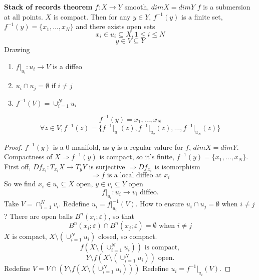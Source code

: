 \begin{theorem}
  \textbf{Stack of records theorem}
  \newline $f: X \to Y$ smooth,
  \newline $dim X = dim Y$
  \newline $f$ is a submersion at all points. $X$ is compact. Then for any $y\in Y$, $f^{-1}(y)$ is a finite set, $f^{-1}(y)=\{x_1,\dots,x_N\}$ and there exists open sets
    $$x_i \in u_i \subseteq X, 1\leq i \leq N$$
    $$y\in V \subseteq Y$$
    Drawing
  \begin{enumerate}[(1)]
    \item $f\rvert_{u_i}: u_i\to V$ is a diffeo
    \item $u_i \cap u_j=\emptyset$ if $i\neq j$
    \item $f^{-1}(V)=\cup_{i=1}^N u_i$
  \end{enumerate}
    $$f^{-1}(y)={x_1,\dots, x_N}$$
    $$\forall z\in V, f^{-1}(z)=\{f^{-1}\rvert_{u_1}(z),f^{-1}\rvert_{u_2}(z),\dots,f^{-1}\rvert_{u_N}(z)\}$$
\end{theorem}
\begin{proof}
  $f^{-1}(y)$ is a $0$-manifold, as $y$ is a regular valure for $f$, $dim X = dim Y$.
  \newline Compactness of $X \Rightarrow f^{-1}(y)$ is compact, so it's finite, $f^{-1}(y)=\{x_1,\dots,x_N\}$.
  \newline First off, $Df_{x_i}:T_{x_i}X \to T_yY$ is surjective $\Rightarrow Df_{x_i}$ is isomorphism
    $$\Rightarrow f \text{ is a local diffeo at }x_i$$
  So we find $x_i\in u_i\subseteq X$ open, $y\in v_i\subseteq Y$ open
    $$f\rvert_{u_i}:u_i \to v_i \text{ diffeo.}$$
  Take $V=\cap_{i=1}^N v_i$. Redefine $u_i=f\rvert_{u_i}^{-1}(V)$.
  \newline How to ensure $u_i \cap u_j=\emptyset$ when $i\neq j$?
  \newline There are open balls $B^n(x_i;\varepsilon)$, so that
    $$B^n(x_i;\varepsilon)\cap B^n(x_j;\varepsilon)=\emptyset \text{ when }i\neq j$$
    $X$ is compact, $X\setminus \left(\cup_{i=1}^Nu_i\right)$ closed, so compact.
      $$f(X\setminus \left(\cup_{i=1}^Nu_i\right)) \text{ is compact},$$
      $$Y\setminus f(X\setminus \left(\cup_{i=1}^Nu_i\right))\text{ open}.$$
    Redefine $V=V\cap \left(Y\setminus f(X\setminus \left(\cup_{i=1}^Nu_i\right))\right)$
    \newline Redefine $u_i=f^{-1}\rvert_{u_i}(V)$.
\end{proof}
